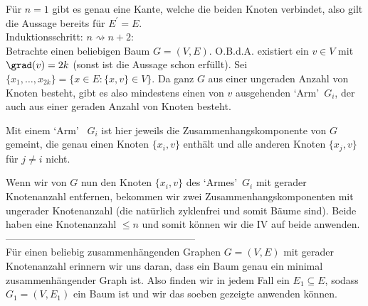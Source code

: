 \begin{solution}
Für $n = 1$ gibt es genau eine Kante, welche die beiden Knoten verbindet,
also gilt die Aussage bereits für $E^{\prime} = E$. \\

Induktionsschritt: $n \rightsquigarrow n + 2$: \\
Betrachte einen beliebigen Baum $G = (V,E)$.
O.B.d.A. existiert ein $v \in V$ mit $\grad(v) = 2k$ (sonst ist die Aussage schon erfüllt). Sei $\{x_1,\dots,x_{2k}\} = \{x \in E: \{x,v \} \in V\}$.
Da ganz $G$ aus einer ungeraden Anzahl von Knoten besteht, gibt es also mindestens einen von $v$ ausgehenden \textquoteleft{Arm}\textquoteright ~$G_i$, der auch aus einer geraden Anzahl von Knoten besteht.

Mit einem \textquoteleft{Arm}\textquoteright ~ $G_i$ ist hier jeweils die Zusammenhangskomponente von $G$ gemeint, die genau einen Knoten $\{x_i,v\}$ enthält und alle anderen Knoten $\{x_j,v\}$ für $j \neq i$ nicht.

Wenn wir von $G$ nun den Knoten $\{x_i,v\}$ des \textquoteleft{Armes}\textquoteright ~$G_i$ mit gerader Knotenanzahl entfernen, bekommen wir zwei Zusammenhangskomponenten mit ungerader Knotenanzahl (die natürlich zyklenfrei und somit Bäume sind). Beide haben eine Knotenanzahl $\leq n$ und somit können wir die IV auf beide anwenden. \\

---------------------------------------------------------\\


Für einen beliebig zusammenhängenden Graphen $G = (V,E)$ mit gerader Knotenanzahl
erinnern wir uns daran, dass
ein Baum genau ein minimal zusammenhängender Graph ist.
Also finden wir in jedem Fall ein $E_1 \subseteq E$, sodass $G_1 = (V,E_1)$
ein Baum ist und wir das soeben gezeigte anwenden können.

\end{solution}

